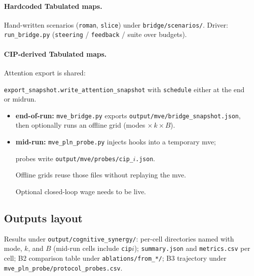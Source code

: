\documentclass[11pt]{article}
\theoremstyle{definition}
\begin{document}
\paragraph{Hardcoded Tabulated maps.}
Hand-written scenarios (\texttt{roman}, \texttt{slice}) under \texttt{bridge/scenarios/}. Driver: \texttt{run\_bridge.py} (\texttt{steering} / \texttt{feedback} / suite over budgets).

\paragraph{CIP-derived Tabulated maps.}
Attention export is shared: 

\texttt{export\_snapshot.write\_attention\_snapshot} with \texttt{schedule} either at the end or midrun.
\begin{itemize}
    \item \textbf{end-of-run:} \texttt{mve\_bridge.py} exports \texttt{output/mve/bridge\_snapshot.json}, then optionally runs an offline grid (modes $\times\,k\times B$).
    \item \textbf{mid-run:} \texttt{mve\_pln\_probe.py} injects hooks into a temporary mve; 
    
    probes write \texttt{output/mve/probes/cip\_$i$.json}. 
    
    Offline grids reuse those files without replaying the mve. 
    
    Optional closed-loop wage needs to be live.
\end{itemize}

\subsection{Outputs layout}

Results under \texttt{output/cognitive\_synergy/}: per-cell directories named with mode, $k$, and $B$ (mid-run cells include \texttt{cip}$i$); \texttt{summary.json} and \texttt{metrics.csv} per cell; B2 comparison table under \texttt{ablations/from\_*/}; B3 trajectory under \texttt{mve\_pln\_probe/protocol\_probes.csv}.
\end{document}

